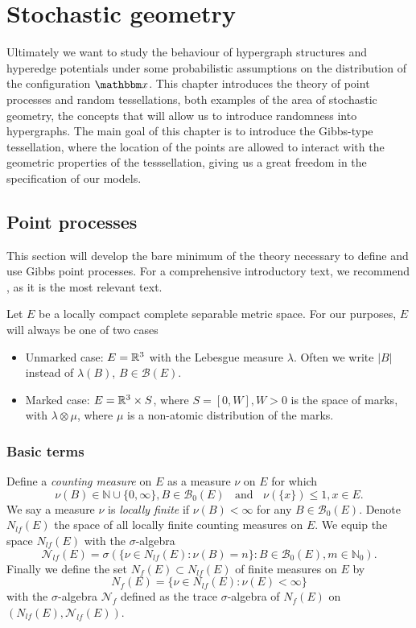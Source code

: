 \chapter{Stochastic geometry}
Ultimately we want to study the behaviour of hypergraph structures and hyperedge potentials under some probabilistic assumptions on the distribution of the configuration $\x$. This chapter introduces the theory of point processes and random tessellations, both examples of the area of stochastic geometry, the concepts that will allow us to introduce randomness into hypergraphs. The main goal of this chapter is to introduce the Gibbs-type tessellation, where the location of the points are allowed to interact with the geometric properties of the tesssellation, giving us a great freedom in the specification of our models.

\section{Point processes}
This section will develop the bare minimum of the theory necessary to define and use Gibbs point processes. For a comprehensive introductory text, we recommend \cite{MollerWaagepetersen2003}, as it is the most relevant text. 


Let $E$ be a locally compact complete separable metric space. For our purposes, $E$ will always be one of two cases
\begin{itemize}
	\item Unmarked case: $E = {\mathbb R^3}$ with the Lebesgue measure $\lambda$. Often we write $|B|$ instead of $\lambda(B)$, $B\in \mathcal B(E)$.
	\item Marked case: $E = {\mathbb R^3}\times S$, where $S=[0,W],W>0$ is the space of marks, with $\lambda \otimes \mu$, where $\mu$ is a non-atomic distribution of the marks. 
\end{itemize}

\subsection{Basic terms}
\begin{definition}\label{def:measures}
Define a \textit{counting measure} on $E$ as a measure $\nu$ on $E$ for which
$$\nu(B)\in\mathbb N \cup \{0,\infty\}, B\in\mathcal B_0(E)\;\;\text{ and } \; \; \nu(\{x\})\leq 1, x\in E.$$
We say a measure $\nu$ is \textit{locally finite} if $\nu(B)<\infty$ for any $B\in \mathcal  B_0(E)$. Denote $N_{lf}(E)$ the space of all locally finite counting measures on $E$.
We equip the space $N_{lf}(E)$ with the $\sigma$-algebra
$$\mathcal N_{lf}(E)=\sigma(\{\nu \in N_{lf}(E): \nu(B)=n\}: B \in \mathcal B_0(E), m\in \mathbb N_0).$$
Finally we define the set $N_f(E) \subset N_{lf}(E)$ of finite measures on $E$ by
$$N_f(E) = \{\nu \in N_{lf}(E): \nu(E)<\infty\}$$
with the $\sigma$-algebra $\mathcal N_{f}$ defined as the trace $\sigma$-algebra of $N_{f}(E)$ on $(N_{lf}(E),\mathcal N_{lf}(E))$.
\end{definition}


